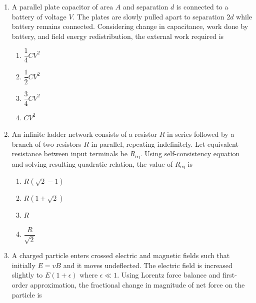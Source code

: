 \documentclass[12pt]{article}
\begin{document}
\begin{enumerate}[leftmargin=*]
\item A parallel plate capacitor of area $A$ and separation $d$ is connected to a battery of voltage $V$. The plates are slowly pulled apart to separation $2d$ while battery remains connected. Considering change in capacitance, work done by battery, and field energy redistribution, the external work required is

\begin{enumerate}
\item $\dfrac{1}{4}CV^2$
\item $\dfrac{1}{2}CV^2$
\item $\dfrac{3}{4}CV^2$
\item $CV^2$
\end{enumerate}

\item An infinite ladder network consists of a resistor $R$ in series followed by a branch of two resistors $R$ in parallel, repeating indefinitely. Let equivalent resistance between input terminals be $R_{\text{eq}}$. Using self-consistency equation and solving resulting quadratic relation, the value of $R_{\text{eq}}$ is

\begin{enumerate}
\item $R(\sqrt{2}-1)$
\item $R(1+\sqrt{2})$
\item $R$
\item $\dfrac{R}{\sqrt{2}}$
\end{enumerate}

\item A charged particle enters crossed electric and magnetic fields such that initially $E=vB$ and it moves undeflected. The electric field is increased slightly to $E(1+\epsilon)$ where $\epsilon\ll1$. Using Lorentz force balance and first-order approximation, the fractional change in magnitude of net force on the particle is

\begin{center}
\end{center}


\end{enumerate}
\end{document}

